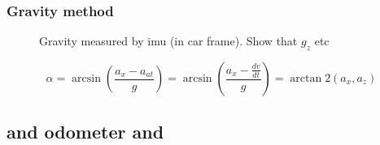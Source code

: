 \subsubsection{Gravity method}
\begin{figure}[htpb]
    \centering
    
    \caption{Gravity measured by \acrshort{imu} (in car frame). Show that $g_z$ etc}
    \label{fig:tikz_car_gravity}
\end{figure}
\begin{equation}
    \alpha =\arcsin\left(\frac{a_x-a_{at}}{g}\right)=\arcsin\left(\frac{a_x-\frac{dv}{dt}}{g}\right) = \arctan2(a_x,a_z)
    \end{equation}


\subsection{ and odometer and }
